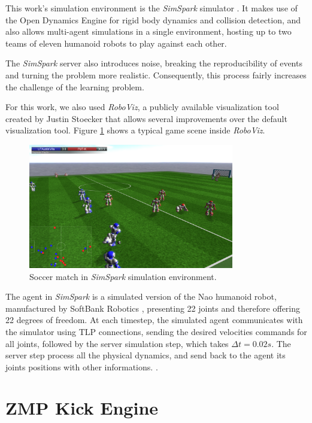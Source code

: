 This work's simulation environment is the \textit{SimSpark} simulator \cite{Simspark}. It makes use of the Open Dynamics Engine \cite{ODE} for rigid body dynamics and collision detection, and also allows multi-agent simulations in a single environment, hosting up to two teams of eleven humanoid robots to play against each other.

The \textit{SimSpark} server also introduces noise, breaking the reproducibility of events and turning the problem more realistic. Consequently, this process fairly increases the challenge of the learning problem.

For this work, we also used \textit{RoboViz}, a publicly available visualization tool created by Justin Stoecker \cite{RoboViz} that allows several improvements over the default visualization tool. Figure \ref{fig:roboviz_game} shows a typical game scene inside \textit{RoboViz}.

\begin{figure}[H]
    \centering
    \includegraphics[width=0.8\textwidth]{Chapter5/sim3d.png} 
    \caption{Soccer match in \textit{SimSpark} simulation environment.}
    \label{fig:roboviz_game}
\end{figure}

The agent in \textit{SimSpark} is a simulated version of the Nao humanoid robot, manufactured by SoftBank Robotics \cite{NaoRobot}, presenting 22 joints and therefore offering 22 degrees of freedom. At each timestep, the simulated agent communicates with the simulator using TLP connections, sending the desired velocities commands for all joints, followed by the server simulation step, which takes $\Delta t = 0.02s$. The server step process all the physical dynamics, and send back to the agent its joints positions with other informations. \cite{SimSparkEffectors}.

\section{ZMP Kick Engine}
\label{sec:ZMPkick}

